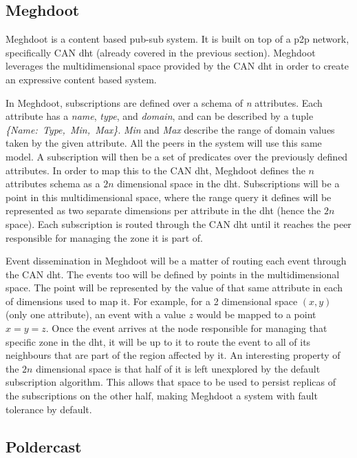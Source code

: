 \subsection{Meghdoot}\label{meghdoot}

Meghdoot \cite{Gupta2004} is a content based pub-sub system.
It is built on top of a \acrshort{p2p} network, specifically CAN \acrshort{dht} (already
covered in the previous section). Meghdoot leverages the
multidimensional space provided by the CAN \acrshort{dht} in order to create an
expressive content based system.

In Meghdoot, subscriptions are defined over a schema of \emph{n}
attributes. Each attribute has a \emph{name}, \emph{type}, and
\emph{domain}, and can be described by a tuple
\emph{\{Name:\ Type,\ Min,\ Max\}}. \emph{Min} and \emph{Max} describe
the range of domain values taken by the given attribute. All the peers
in the system will use this same model. A subscription will then be a
set of predicates over the previously defined attributes. In order to
map this to the CAN \acrshort{dht}, Meghdoot defines the $n$ attributes schema
as a $2n$ dimensional space in the \acrshort{dht}. Subscriptions will be a
point in this multidimensional space, where the range query it defines
will be represented as two separate dimensions per attribute in the \acrshort{dht}
(hence the $2n$ space). Each subscription is routed through the CAN
\acrshort{dht} until it reaches the peer responsible for managing the zone it is
part of.

Event dissemination in Meghdoot will be a matter of routing each event
through the CAN \acrshort{dht}. The events too will be defined by points in the
multidimensional space. The point will be represented by the value of
that same attribute in each of dimensions used to map it. For example,
for a 2 dimensional space $(x,y)$ (only one attribute), an event
with a value $z$ would be mapped to a point $x=y=z$. Once the
event arrives at the node responsible for managing that specific zone in
the \acrshort{dht}, it will be up to it to route the event to all of its neighbours
that are part of the region affected by it. An interesting property of
the $2n$ dimensional space is that half of it is left unexplored by
the default subscription algorithm. This allows that space to be used to persist
replicas of the subscriptions on the other half, making Meghdoot a
system with fault tolerance by default.

\subsection{Poldercast}\label{poldercast}

